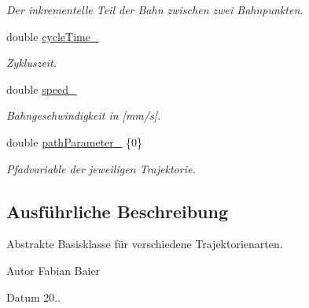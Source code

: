 \begin{DoxyCompactItemize}
\begin{DoxyCompactList}\small\item\em Der inkrementelle Teil der Bahn zwischen zwei Bahnpunkten. \end{DoxyCompactList}\item 
\hypertarget{classITrajectory_a04719c7e04b7c358e1a68cd5c9deba90}{double \hyperlink{classITrajectory_a04719c7e04b7c358e1a68cd5c9deba90}{cycle\-Time\-\_\-}}\label{classITrajectory_a04719c7e04b7c358e1a68cd5c9deba90}

\begin{DoxyCompactList}\small\item\em Zykluszeit. \end{DoxyCompactList}\item 
\hypertarget{classITrajectory_ab6ca758355699639b9210b55feb8de20}{double \hyperlink{classITrajectory_ab6ca758355699639b9210b55feb8de20}{speed\-\_\-}}\label{classITrajectory_ab6ca758355699639b9210b55feb8de20}

\begin{DoxyCompactList}\small\item\em Bahngeschwindigkeit in \mbox{[}mm/s\mbox{]}. \end{DoxyCompactList}\item 
\hypertarget{classITrajectory_adbe59ec29a3bc03f0d539cad15ccd935}{double \hyperlink{classITrajectory_adbe59ec29a3bc03f0d539cad15ccd935}{path\-Parameter\-\_\-} \{0\}}\label{classITrajectory_adbe59ec29a3bc03f0d539cad15ccd935}

\begin{DoxyCompactList}\small\item\em Pfadvariable der jeweiligen Trajektorie. \end{DoxyCompactList}\end{DoxyCompactItemize}


\subsection{Ausführliche Beschreibung}
Abstrakte Basisklasse für verschiedene Trajektorienarten. 

\begin{DoxyAuthor}{Autor}
Fabian Baier 
\end{DoxyAuthor}
\begin{DoxyDate}{Datum}
20.. 
\end{DoxyDate}



